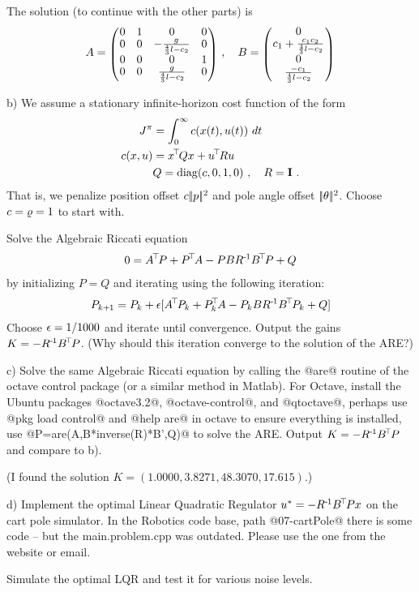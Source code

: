 The solution (to continue with the other parts) is
\begin{align*}
A = \mat{cccc}{0 & 1 & 0 & 0 \\
  0 & 0 & -\frac{g}{\frac{4}{3} l - c_2} & 0 \\
 0 & 0 & 0 & 1 \\
 0 & 0 & \frac{g}{\frac{4}{3} l - c_2} & 0 }
\comma
B = \mat{c}{0 \\
c_1+\frac{c_1 c_2}{\frac{4}{3} l - c_2} \\
0 \\
\frac{-c_1}{\frac{4}{3} l - c_2}}
\end{align*}


b) We assume a stationary infinite-horizon cost function of the form
\begin{align*}
J^\pi
&= \int_0^\infty c(x(t),u(t))~ dt \\
c(x,u)
&= x^{\!\top\!} Q x + u^{\!\top\!} R u \\
& Q = {\rm diag}(c, 0, 1, 0) ~,\quad R = {\rm\bf I} ~.
\end{align*}
That is, we penalize position offset $c|\!|p|\!|^2$ and pole angle
offset $|\!|\theta|\!|^2$. Choose $c=\varrho=1$ to start with.

Solve the Algebraic Riccati equation
\begin{align*}
0 = A^{\!\top\!} P + P^{\!\top\!} A - P B R^{{\hspace*{-.0pt}\text{\rm -}\hspace*{-.5pt}}1} B^{\!\top\!} P + Q
\end{align*}
by initializing $P=Q$ and iterating using the following iteration:
\begin{align*}
P_{k{{\hspace*{-.0pt}\text{\rm +}\hspace*{-.5pt}}1}} = P_k + \epsilon [A^{\!\top\!} P_k + P_k^{\!\top\!} A - P_k B R^{{\hspace*{-.0pt}\text{\rm -}\hspace*{-.5pt}}1} B^{\!\top\!} P_k + Q]
\end{align*}
Choose $\epsilon=1/1000$ and iterate until convergence. Output the gains $K=
-R^{{\hspace*{-.0pt}\text{\rm -}\hspace*{-.5pt}}1} B^{\!\top\!} P$. (Why should this iteration converge to the solution of
the ARE?)

c) Solve the same Algebraic Riccati equation by calling the @are@
routine of the octave control package (or a similar method in Matlab).
For Octave, install the Ubuntu packages @octave3.2@, @octave-control@,
and @qtoctave@, perhaps use @pkg load control@ and @help are@ in
octave to ensure everything is installed, use %
@P=are(A,B*inverse(R)*B',Q)@ to solve the ARE. Output $K= -R^{{\hspace*{-.0pt}\text{\rm -}\hspace*{-.5pt}}1} B^{\!\top\!} P$
and compare to b).

(I found the solution $K=(1.0000, 3.8271, 48.3070,17.615)$.)

d) Implement the optimal Linear Quadratic Regulator $u^*= -R^{{\hspace*{-.0pt}\text{\rm -}\hspace*{-.5pt}}1} B^{\!\top\!} P
x$ on the cart pole simulator. In the Robotics code base, path
@07-cartPole@ there is some code -- but the main.problem.cpp was
outdated. Please use the one from the website or email.

Simulate the optimal LQR and test it for various noise levels.



\exerfoot



